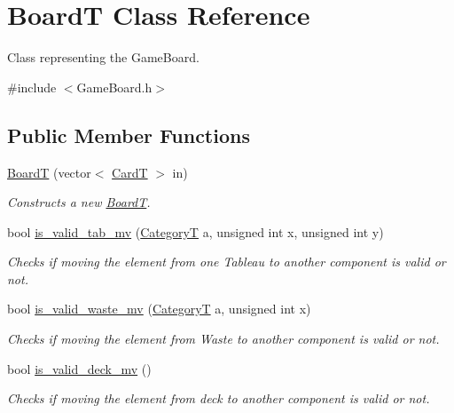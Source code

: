 \hypertarget{class_board_t}{}\section{BoardT Class Reference}
\label{class_board_t}


Class representing the Game\+Board.  




{\ttfamily \#include $<$Game\+Board.\+h$>$}

\subsection*{Public Member Functions}
\begin{DoxyCompactItemize}
\item 
\mbox{\hyperlink{class_board_t_a169b9354c66aa248225b6f8f4fcd6c31}{BoardT}} (vector$<$ \mbox{\hyperlink{struct_card_t}{CardT}} $>$ in)
\begin{DoxyCompactList}\small\item\em Constructs a new \mbox{\hyperlink{class_board_t}{BoardT}}. \end{DoxyCompactList}\item 
bool \mbox{\hyperlink{class_board_t_a7cdf3c7b6e7dc458aac28955cc08f420}{is\+\_\+valid\+\_\+tab\+\_\+mv}} (\mbox{\hyperlink{_card_types_8h_aa77f81f8d4c8aa57046a50ca32d6b7b4}{CategoryT}} a, unsigned int x, unsigned int y)
\begin{DoxyCompactList}\small\item\em Checks if moving the element from one Tableau to another component is valid or not. \end{DoxyCompactList}\item 
bool \mbox{\hyperlink{class_board_t_ab571e4faa245e2d62d4f67ffdc79ef34}{is\+\_\+valid\+\_\+waste\+\_\+mv}} (\mbox{\hyperlink{_card_types_8h_aa77f81f8d4c8aa57046a50ca32d6b7b4}{CategoryT}} a, unsigned int x)
\begin{DoxyCompactList}\small\item\em Checks if moving the element from Waste to another component is valid or not. \end{DoxyCompactList}\item 
bool \mbox{\hyperlink{class_board_t_affe6cfc5c246bcfa0afd59476c70db8c}{is\+\_\+valid\+\_\+deck\+\_\+mv}} ()
\begin{DoxyCompactList}\small\item\em Checks if moving the element from deck to another component is valid or not. \end{DoxyCompactList}\item 

\end{DoxyCompactItemize}
